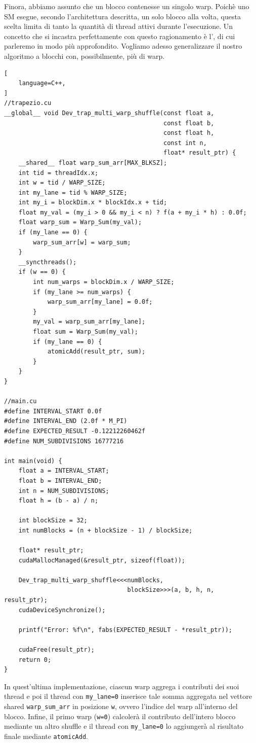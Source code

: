 Finora, abbiamo assunto che un blocco contenesse un singolo warp.
Poichè uno SM esegue, secondo l'architettura descritta, un solo blocco alla volta, questa scelta limita di tanto la quantità di thread attivi durante l'esecuzione.
Un concetto che si incastra perfettamente con questo ragionamento è l', di cui parleremo in modo più approfondito.
Vogliamo adesso generalizzare il nostro algoritmo a blocchi con, possibilmente, più di warp.

\begin{lstlisting}[
    language=C++, 
]
//trapezio.cu
__global__ void Dev_trap_multi_warp_shuffle(const float a, 
                                            const float b, 
                                            const float h, 
                                            const int n, 
                                            float* result_ptr) {
    __shared__ float warp_sum_arr[MAX_BLKSZ];   
    int tid = threadIdx.x;
    int w = tid / WARP_SIZE;
    int my_lane = tid % WARP_SIZE;
    int my_i = blockDim.x * blockIdx.x + tid;
    float my_val = (my_i > 0 && my_i < n) ? f(a + my_i * h) : 0.0f;
    float warp_sum = Warp_Sum(my_val);
    if (my_lane == 0) {
        warp_sum_arr[w] = warp_sum;
    }
    __syncthreads(); 
    if (w == 0) {
        int num_warps = blockDim.x / WARP_SIZE;
        if (my_lane >= num_warps) {
            warp_sum_arr[my_lane] = 0.0f;
        }
        my_val = warp_sum_arr[my_lane];
        float sum = Warp_Sum(my_val);
        if (my_lane == 0) {
            atomicAdd(result_ptr, sum);
        }
    }
}

//main.cu
#define INTERVAL_START 0.0f
#define INTERVAL_END (2.0f * M_PI)
#define EXPECTED_RESULT -0.12212260462f
#define NUM_SUBDIVISIONS 16777216

int main(void) {
    float a = INTERVAL_START;
    float b = INTERVAL_END;
    int n = NUM_SUBDIVISIONS;
    float h = (b - a) / n;

    int blockSize = 32;
    int numBlocks = (n + blockSize - 1) / blockSize;
    
    float* result_ptr;
    cudaMallocManaged(&result_ptr, sizeof(float));

    Dev_trap_multi_warp_shuffle<<<numBlocks, 
                                  blockSize>>>(a, b, h, n, result_ptr);
    cudaDeviceSynchronize();

    printf("Error: %f\n", fabs(EXPECTED_RESULT - *result_ptr));
    
    cudaFree(result_ptr);
    return 0;
}
\end{lstlisting}
In quest'ultima implementazione, ciascun warp aggrega i contributi dei suoi thread e poi il thread con \texttt{my\_lane=0} inserisce tale somma aggregata nel vettore shared \texttt{warp\_sum\_arr} in posizione \texttt{w}, ovvero l'indice del warp all'interno del blocco.
Infine, il primo warp (\texttt{w=0}) calcolerà il contributo dell'intero blocco mediante un altro shuffle e il thread con \texttt{my\_lane=0} lo aggiungerà al risultato finale mediante \texttt{atomicAdd}.

